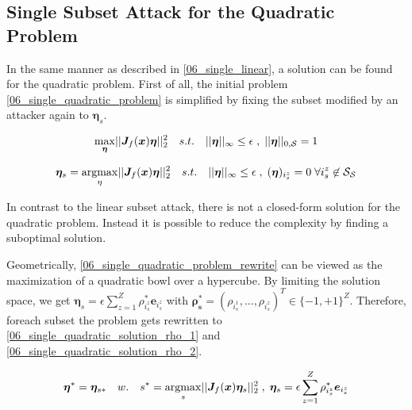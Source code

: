 \subsection{Single Subset Attack for the Quadratic Problem}\label{06_single_quadratic}


\begingroup
In the same manner as described in \autoref{06_single_linear}, a solution can be found for the quadratic problem.
First of all, the initial problem \ref{06_single_quadratic_problem} is simplified by fixing the subset modified by an attacker
again to $\bm{\eta}_s$.
\endgroup


\begin{equation}
\begin{aligned}
	\max_{\bm{\eta}} \lvert\lvert \bm{J}_f(\bm{x}) \bm{\eta} \rvert\rvert_2^2 \quad s.t. \quad \lvert\lvert \bm{\eta} \rvert\rvert_{\infty} \leq \epsilon \; , \; \lvert\lvert \bm{\eta} \rvert\rvert_{0,\mathcal{S}} = 1
\end{aligned}
\label{06_single_quadratic_problem}
\end{equation}

\begin{equation}
\begin{aligned}
	\bm{\eta}_s = \operatorname*{argmax}_{\eta} \lvert\lvert \bm{J}_f(\bm{x}) \bm{\eta} \rvert\rvert_2^2 \quad s.t. \quad \lvert\lvert \bm{\eta} \rvert\rvert_{\infty} \leq \epsilon \;, \; (\bm{\eta})_{i_s^z} = 0 \; \forall i_s^z \not\in \mathcal{S}_{\mathcal{S}}
\end{aligned}
\label{06_single_quadratic_problem_rewrite}
\end{equation}

\begingroup
In contrast to the linear subset attack, there is not a closed-form solution for the quadratic problem.
Instead it is possible to reduce the complexity by finding a suboptimal solution.

Geometrically, \ref{06_single_quadratic_problem_rewrite} can be viewed
as the maximization of a quadratic bowl over a hypercube. By limiting the solution space, we get $\bm{\eta}_s = \epsilon \sum_{z=1}^{Z} \rho_{i_s^z}^* \bm{e}_{i^z_s}$
with $\bm{\rho^*_s} = (\rho_{i_s^1}, ..., \rho_{i_s^z})^T \in \{ -1, +1\}^Z $. Therefore, foreach subset the problem gets rewritten to \ref{06_single_quadratic_solution_rho_1} and \ref{06_single_quadratic_solution_rho_2}.
\endgroup

\begin{equation}
\begin{aligned}
	\bm{\eta}^* = \bm{\eta}_{s*} \quad w. \quad s^* = \operatorname*{argmax}_s \lvert\lvert \bm{J}_f(\bm{x}) \bm{\eta}_s \rvert\rvert_2^2 \; , \; \bm{\eta}_s = \epsilon \sum_{z=1}^{Z} \rho_{i_s^z}^* \bm{e}_{i^z_s}
\end{aligned}
\label{06_single_quadratic_solution_rho_1}
\end{equation}

